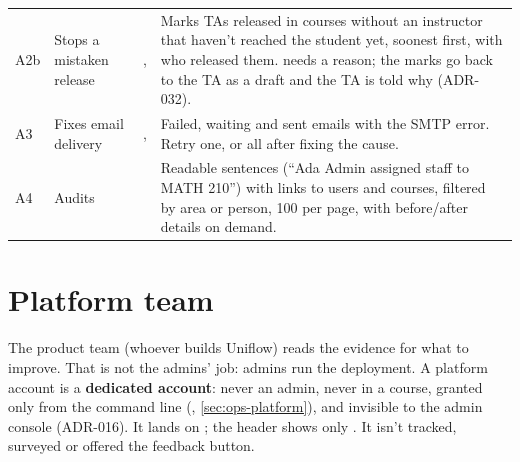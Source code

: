 {\begin{xltabular}{\linewidth}{@{}l P{34mm} P{30mm} L@{}}
  A2b & Stops a mistaken release & ,  & Marks TAs released in courses without an instructor that haven't reached the student yet, soonest first, with who released them.  needs a reason; the marks go back to the TA as a draft and the TA is told why (ADR-032).\\
  A3 & Fixes email delivery & ,  & Failed, waiting and sent emails with the SMTP error. Retry one, or all after fixing the cause.\\
  A4 & Audits &  & Readable sentences (``Ada Admin assigned staff to MATH 210'') with links to users and courses, filtered by area or person, 100 per page, with before/after details on demand.\\
  \bottomrule
\end{xltabular}}


\section{Platform team}\label{sec:journey-platform}

The product team (whoever builds Uniflow) reads the evidence for what to improve. That is not the
admins' job: admins run the deployment. A platform account is a \textbf{dedicated account}: never
an admin, never in a course, granted only from the command line (,
\cref{sec:ops-platform}), and invisible to the admin console (ADR-016). It lands on
; the header shows only . It isn't tracked, surveyed or offered the
feedback button.

